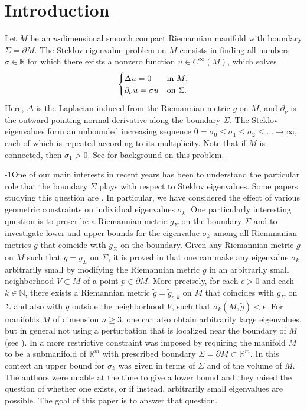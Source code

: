 \documentclass{CUP-JNL-FMP}%
\theoremstyle{definition}
\numberwithin{equation}{section}
\begin{document}
\section{Introduction}
Let $M$ be an $n$-dimensional smooth compact Riemannian manifold with boundary $\Sigma=\partial M$.  The Steklov
eigenvalue problem on $M$ consists in\vadjust{\clearpage} finding all numbers $\sigma\in\mathbb{R}$ for which there exists a nonzero function $u \in C^\infty(M)$, which solves
\begin{equation*}
    \begin{cases}
        \Delta u = 0 & \text{in  $M$,} \\
        \partial_\nu u = \sigma u & \text{on  $\Sigma$.}
    \end{cases}\vspace*{-2pt}
\end{equation*}
Here, $\Delta$ is the Laplacian induced from the Riemannian metric $g$ on $M$, and $\partial_\nu$
is the outward pointing normal derivative along the boundary $\Sigma$. The Steklov eigenvalues
form an unbounded increasing sequence
$0 = \sigma_0 \leq \sigma_1 \leq \sigma_2 \leq \dots \to \infty$, each of which is repeated according to its multiplicity.
Note that if $M$ is connected, then $\sigma_1>0$.
See \cite{GP17,legacy} for background on this problem.

\looseness-1One of our main interests in recent years has been to understand the particular role that the boundary  $\Sigma$ plays with respect to Steklov eigenvalues. Some papers studying this question are \cite{CGH18, PS16,CESG17,CG18,WX09,Kar15,GPPS,CGG17,shamma}.
In particular, we have considered the effect of various geometric constraints on individual eigenvalues $\sigma_k$. One particularly interesting question is to prescribe a Riemannian metric $g_\Sigma$ on the boundary $\Sigma$ and to investigate lower and upper bounds for the eigenvalue $\sigma_k$ among all Riemmanian metrics $g$ that coincide with $g_\Sigma$ on the boundary. Given any Riemannian metric $g$ on $M$ such that $g=g_\Sigma$ on $\Sigma$, it is proved in \cite{CESG17} that one can make any eigenvalue $\sigma_k$ arbitrarily small by modifying the Riemannian metric $g$ in an arbitrarily small neighborhood $V\subset M$ of a point $p\in\partial M$. More precisely, for each $\epsilon>0$ and each $k\in\mathbb{N}$, there exists a Riemannian metric $\widetilde{g}=\widetilde{g}_{\epsilon,k}$ on $M$ that coincides with $g_\Sigma$ on $\Sigma$ and also with $g$ outside the neighborhood $V$, such that $\sigma_k(M,\widetilde{g})<\epsilon$. For manifolds $M$ of dimension $n\geq 3$, one can also obtain arbitrarily large eigenvalues, but in general not using a perturbation that is localized near the boundary of $M$ (see \cite{CESG17,CG18}). In \cite{CGG17} a more restrictive constraint was imposed by requiring the manifold $M$ to be a submanifold of $\mathbb{R}^m$ with prescribed boundary $\Sigma=\partial M\subset\mathbb{R}^m$. In this context an upper bound for $\sigma_k$ was given in terms of $\Sigma$ and of the volume of $M$. The authors were unable at the time to give a lower bound and they raised the question of whether one exists, or if instead, arbitrarily small eigenvalues are possible. The goal of this paper is to answer that question.
\end{document}
